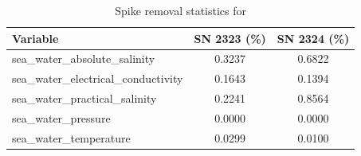 \begin{table}[h]
\centering
\caption{Spike removal statistics for \projectname{} \casenumber{}}
\label{tab:spike_stats}
\begin{tabular}{|l|c|c|}
\hline
Variable & SN 2323 (\%) & SN 2324 (\%) \\
\hline
sea\_water\_absolute\_salinity & 0.3237 & 0.6822 \\
sea\_water\_electrical\_conductivity & 0.1643 & 0.1394 \\
sea\_water\_practical\_salinity & 0.2241 & 0.8564 \\
sea\_water\_pressure & 0.0000 & 0.0000 \\
sea\_water\_temperature & 0.0299 & 0.0100 \\
\hline
\end{tabular}
\end{table}
